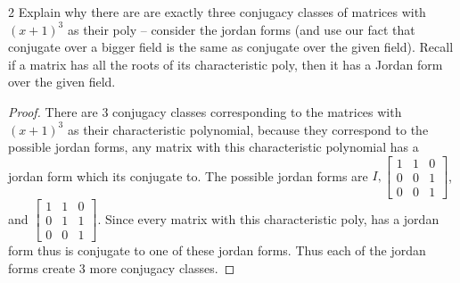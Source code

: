 \documentclass{article}
\begin{document}
\bigskip

\begin{PROB}{2}\label{Problem 2.}
    Explain why there are are exactly three conjugacy classes of matrices with $(x+1)^3$ as their poly -- consider the jordan forms (and use our fact that conjugate over a bigger field is the same as conjugate over the given field). Recall if a matrix has all the roots of its characteristic poly, then it has a Jordan form over the given field.
\end{PROB}
\begin{proof}
    There are 3 conjugacy classes corresponding to the matrices with $(x + 1)^3$ as their characteristic polynomial, because they correspond to the possible jordan forms, any matrix with this characteristic polynomial has a jordan form which its conjugate to. The possible jordan forms are $I, \begin{bmatrix}
        1 & 1 & 0 \\ 0 & 0 & 1 \\ 0 & 0 & 1
    \end{bmatrix}$, and $\begin{bmatrix}
        1 & 1 & 0 \\ 0 & 1 & 1 \\ 0 & 0 & 1
    \end{bmatrix}$. Since every matrix with this characteristic poly, has a jordan form thus is conjugate to one of these jordan forms. Thus each of the jordan forms create 3 more conjugacy classes. 
\end{proof}
\end{document}
